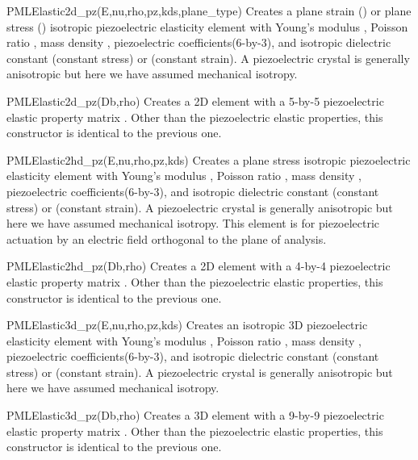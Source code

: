 \begin{codelist}
  \item[PMLElastic2d\_pz(E,nu,rho,pz,kds,plane\_type)]
    Creates a plane strain () or plane stress
    () isotropic piezoelectric elasticity element with
    Young's modulus , Poisson ratio , mass
    density , piezoelectric coefficients(6-by-3), and isotropic
    dielectric constant (constant stress) or 
    (constant strain). A piezoelectric crystal is generally anisotropic 
    but here we have assumed mechanical isotropy.

  \item[PMLElastic2d\_pz(Db,rho)]
    Creates a 2D element with a 5-by-5 piezoelectric elastic property matrix
    .  Other than the piezoelectric elastic properties, this constructor
    is identical to the previous one.

  \item[PMLElastic2hd\_pz(E,nu,rho,pz,kds)]
    Creates a plane stress
    isotropic piezoelectric elasticity element with
    Young's modulus , Poisson ratio , mass
    density , piezoelectric coefficients(6-by-3), and isotropic
    dielectric constant (constant stress) or 
    (constant strain). A piezoelectric crystal is generally anisotropic 
    but here we have assumed mechanical isotropy. This element is for 
    piezoelectric actuation by an electric field orthogonal to the 
    plane of analysis.

  \item[PMLElastic2hd\_pz(Db,rho)]
    Creates a 2D element with a 4-by-4 piezoelectric elastic property matrix
    .  Other than the piezoelectric elastic properties, this constructor
    is identical to the previous one.

  \item[PMLElastic3d\_pz(E,nu,rho,pz,kds)]
    Creates an isotropic 3D piezoelectric elasticity element 
    with Young's modulus
    , Poisson ratio , mass density ,
    piezoelectric coefficients(6-by-3), and isotropic
    dielectric constant (constant stress) or 
    (constant strain). A piezoelectric crystal is generally anisotropic 
    but here we have assumed mechanical isotropy.

  \item[PMLElastic3d\_pz(Db,rho)]
    Creates a 3D element with a 9-by-9 piezoelectric elastic property matrix
    .  Other than the piezoelectric elastic properties, this constructor
    is identical to the previous one.
\end{codelist}

